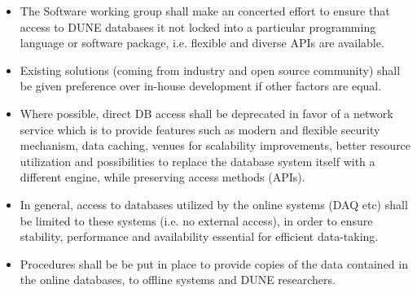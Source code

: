 \begin{itemize}

\item The Software working group shall make an concerted effort to ensure that access to DUNE databases it not 
locked into a particular programming language or software package, i.e. flexible and diverse APIs are available.

\item Existing solutions (coming from industry and open source community) shall be given preference over in-house development if other factors are equal.

\item Where possible, direct DB access shall be deprecated in favor of a network service which is to provide features such as modern and flexible security mechanism, data caching, venues for scalability improvements, better resource utilization  and possibilities to replace the database system itself with a different engine, while preserving access methods (APIs).

\item In general, access to databases utilized by the online systems (DAQ etc) shall be limited to these systems (i.e. no external access), in order to ensure stability, performance and availability essential for efficient data-taking.

\item Procedures shall be be put in place to provide copies of the data contained in the online databases, to offline systems and DUNE researchers.

\end{itemize}

